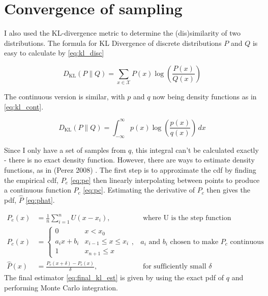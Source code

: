 \section{Convergence of sampling}
I also used the KL-divergence metric to determine the (dis)similarity of two distributions. The formula for KL Divergence of discrete distributions $P$ and $Q$ is easy to calculate by \eqref{eq:kl_disc}

$${D_{\text{KL}}(P\parallel Q)=\sum _{x\in {\mathcal {X}}}P(x)\log \left({\frac {P(x)}{Q(x)}}\right)}$$ \label{eq:kl_disc}

The continuous version is similar, with $p$ and $q$ now being density functions as in \eqref{eq:kl_cont}. 

$${D_\text{KL}}(P\parallel Q)=\int _{-\infty }^{\infty }p(x)\log \left({\frac {p(x)}{q(x)}}\right)\,dx$$ \label{eq:kl_cont}

Since I only have a set of samples from $q$, this integral can't be calculated exactly - there is no exact density function. However, there are ways to estimate density functions, as in (Perez 2008) \cite{perez2008kullback}. The first step is to approximate the cdf by finding the empirical cdf, $P_e$ \eqref{eq:pe} then linearly interpolating between points to produce a continuous function $P_c$ \eqref{eq:pc}. Estimating the derivative of $P_c$ then gives the pdf, $\hat{P}$ \eqref{eq:phat}. 

\begin{align}
	P_e(x)     & = \frac1{n}\sum_{i=1}^n U(x-x_i) ,        & \text{ where U is the step function}\label{eq:pe}      \\ 
	P_c(x)     & = \begin{cases}                                                                                
	0          & x<x_0                                                                                          \\
	a_ix+b_i   & x_{i-1} \leq x \le x_i                                                                         \\
	1          & x_{n+1} \leq x                                                                                 
	\end{cases} \label{eq:pc} ,& \text{$a_i$ and $b_i$ chosen to make $P_c$ continuous }\\ 
	\hat{P}(x) & = \frac{P_c(x+\delta) - P_c(x)}{\delta} , & \text{ for sufficiently small }\delta  \label{eq:phat} 
\end{align}
% 
The final estimator \eqref{eq:final_kl_est} is given by using the exact pdf of $q$ and performing Monte Carlo integration.

